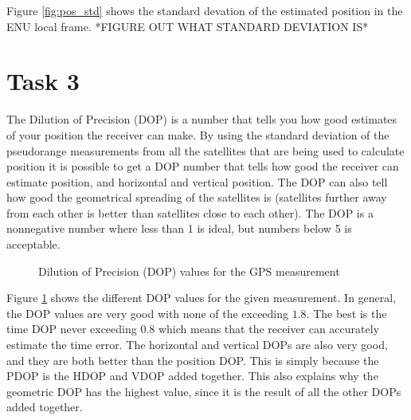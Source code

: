 \documentclass{article}
\begin{document}
Figure \ref{fig:pos_std} shows the standard devation of the estimated position in the ENU local frame. *FIGURE OUT WHAT STANDARD DEVIATION IS*


\section*{Task 3}
The Dilution of Precision (DOP) is a number that tells you how good estimates of your position the receiver can make. By using the standard deviation of the pseudorange measurements from all the satellites that are being used to calculate position it is possible to get a DOP number that tells how good the receiver can estimate position, and horizontal and vertical position. The DOP can also tell how good the geometrical spreading of the satellites is (satellites further away from each other is better than satellites close to each other). The DOP is a nonnegative number where less than 1 is ideal, but numbers below 5 is acceptable.

\begin{figure}[!ht]
    \centering
    \caption{Dilution of Precision (DOP) values for the GPS measurement}
    \label{fig:dop}
\end{figure}

Figure \ref{fig:dop} shows the different DOP values for the given measurement. In general, the DOP values are very good with none of the exceeding $1.8$. The best is the time DOP never exceeding $0.8$ which means that the receiver can accurately estimate the time error. The horizontal and vertical DOPs are also very good, and they are both better than the position DOP. This is simply because the PDOP is the HDOP and VDOP added together. This also explains why the geometric DOP has the highest value, since it is the result of all the other DOPs added together.
\end{document}
